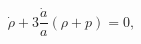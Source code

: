 \begin{equation}\label{energyRS}
\dot\rho + 3\frac{\dot a}{a}\left(\rho + p \right) = 0,
\end{equation}

